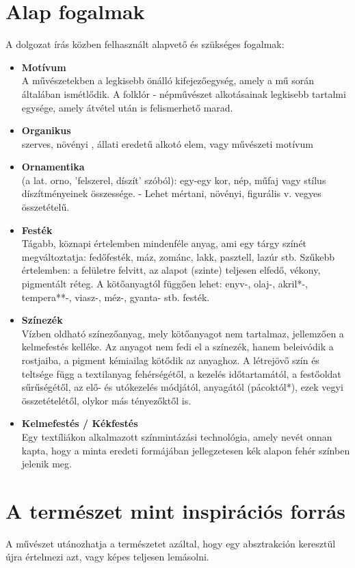 \documentclass[fontsize=12pt, appendixprefix=true]{scrreprt}
\begin{document}
\section{Alap fogalmak}
A dolgozat írás közben felhasznált alapvető és szükséges fogalmak:
\begin{itemize}
	\item \textbf{Motívum} \\  A művészetekben a legkisebb önálló kifejezőegység, amely a mű során általában ismétlődik. A folklór - népművészet alkotásainak legkisebb tartalmi egysége, amely átvétel után is felismerhető marad.
	\item \textbf{Organikus} \\ szerves, növényi , állati eredetű alkotó elem, vagy művészeti motívum
	\item \textbf{Ornamentika} \\ (a lat. orno, 'felszerel, díszít' szóból): egy-egy kor, nép, műfaj vagy stílus díszítményeinek összessége. - Lehet mértani, növényi, figurális v. vegyes összetételű.
	\item \textbf{Festék} \\ Tágabb, köznapi értelemben mindenféle anyag, ami egy tárgy színét megváltoztatja: fedőfesték, máz, zománc, lakk, pasztell, lazúr stb. Szűkebb értelemben: a felületre felvitt, az alapot (szinte) teljesen elfedő, vékony, pigmentált réteg. A kötőanyagtól függően lehet: enyv-, olaj-, akril*-, tempera**-, viasz-, méz-, gyanta- stb. festék.
	\item \textbf{Színezék} \\
	Vízben oldható színezőanyag, mely kötőanyagot nem tartalmaz, jellemzően a kelmefestés kelléke. Az anyagot nem fedi el a színezék, hanem beleivódik a rostjaiba, a pigment kémiailag kötődik az anyaghoz. A létrejövő szín és teltsége függ a textilanyag fehérségétől, a kezelés időtartamától, a festőoldat sűrűségétől, az elő- és utókezelés módjától, anyagától (pácoktól*), ezek vegyi összetételétől, olykor más tényezőktől is.
	\item \textbf{Kelmefestés / Kékfestés} \\ 
	Egy textíliákon alkalmazott színmintázási technológia, amely nevét onnan kapta, hogy a minta eredeti formájában jellegzetesen kék alapon fehér színben jelenik meg.
	\end{itemize}

\section{A természet mint  inspirációs forrás}
A művészet utánozhatja a természetet azáltal, hogy egy absztrakción keresztül újra értelmezi azt, vagy képes teljesen lemásolni.
\end{document}
